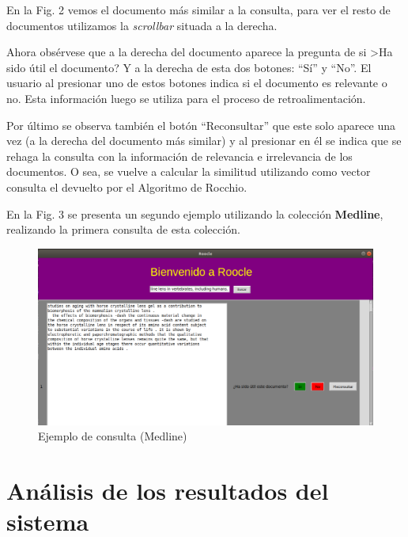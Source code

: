 \documentclass[runningheads]{llncs}
\begin{document}
	En la Fig. 2 vemos el documento m\'as similar a la consulta, para ver el resto de documentos utilizamos la \textit{scrollbar} situada a la derecha.
	
	Ahora obs\'ervese que a la derecha del documento aparece la pregunta de si >Ha sido \'util el documento? Y a la derecha de esta dos botones: ``S\'i'' y ``No''. El usuario al presionar uno de estos botones indica si el documento es relevante o no. Esta informaci\'on luego se utiliza para el proceso de retroalimentaci\'on.
	
	Por \'ultimo se observa tambi\'en el bot\'on ``Reconsultar'' que este solo aparece una vez (a la derecha del documento m\'as similar) y al presionar en \'el se indica que se rehaga la consulta con la informaci\'on de relevancia e irrelevancia de los documentos. O sea, se vuelve a calcular la similitud utilizando como vector consulta el devuelto por el Algoritmo de Rocchio.
	
	En la Fig. 3 se presenta un segundo ejemplo utilizando la colecci\'on \textbf{Medline}, realizando la primera consulta de esta colecci\'on.
	
\begin{figure}[h]
	\begin{center}
		\includegraphics[width =12.0cm]{consulta_2.png}	
		\caption[Fig3]{Ejemplo de consulta (Medline)}	
	\end{center}
\end{figure}

	\section{An\'alisis de los resultados del sistema}
	
\end{document}

